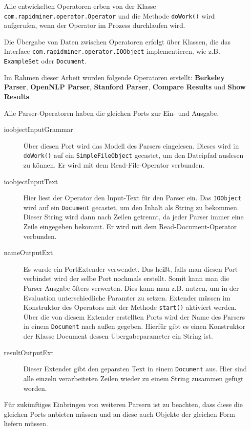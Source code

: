 Alle entwickelten Operatoren erben von der Klasse \texttt{com.rapidminer.operator.Operator} und die Methode \texttt{doWork()} wird aufgerufen, wenn der Operator im Prozess durchlaufen wird. 

Die Übergabe von Daten zwischen Operatoren erfolgt über Klassen, die das Interface \texttt{com.rapidminer.operator.IOObject} implementieren, wie z.B. \texttt{ExampleSet} oder \texttt{Document}. 

Im Rahmen dieser Arbeit wurden folgende Operatoren erstellt: \textbf{Berkeley Parser}, \textbf{OpenNLP Parser}, \textbf{Stanford Parser}, \textbf{Compare Results} und \textbf{Show Results}

Alle Parser-Operatoren haben die gleichen Ports zur Ein- und Ausgabe. 
\begin{description}
\item[ioobjectInputGrammar]
Über diesen Port wird das Modell des Parsers eingelesen. Dieses wird in \texttt{doWork()} auf ein \texttt{SimpleFileObject} gecastet, um den Dateipfad auslesen zu können. Er wird mit dem Read-File-Operator verbunden.
\item[ioobjectInputText] Hier liest der Operator den Input-Text für den Parser ein. Das \texttt{IOObject} wird auf ein \texttt{Document} gecastet, um den Inhalt als String zu bekommen. Dieser String wird dann nach Zeilen getrennt, da jeder Parser immer eine Zeile eingegeben bekommt. Er wird mit dem Read-Document-Operator verbunden.
\item[nameOutputExt] Es wurde ein PortExtender verwendet. Das heißt, falls man diesen Port verbindet wird der selbe Port nochmals erstellt. Somit kann man die Parser Ausgabe öfters verwerten. Dies kann man z.B. nutzen, um in der Evaluation unterschiedliche Paramter zu setzen. Extender müssen im Konstruktor des Operators mit der Methode \texttt{start()} aktiviert werden. Über die von diesem Extender erstellten Ports wird der Name des Parsers in einem \texttt{Document} nach außen gegeben. Hierfür gibt es einen Konstruktor der Klasse Document dessen Übergabeparameter ein String ist. 
\item[resultOutputExt] Dieser Extender gibt den geparsten Text in einem \texttt{Document} aus. Hier sind alle einzeln verarbeiteten Zeilen wieder zu einem String zusammen gefügt worden.
\end{description}

Für zukünftiges Einbringen von weiteren Parsern ist zu beachten, dass diese die gleichen Ports anbieten müssen und an diese auch Objekte der gleichen Form liefern müssen.


